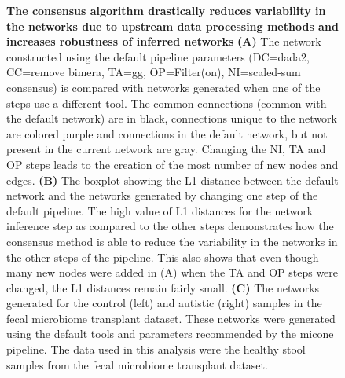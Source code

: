   \FloatBarrier
  \newpage
  \begin{figure}[H]
    \centering
    \caption{
      \textbf{The consensus algorithm drastically reduces variability in the networks due to upstream data processing methods and increases robustness of inferred networks}
      \textbf{(A)} The network constructed using the default pipeline parameters (DC=\ac{dada2}, CC=remove bimera, TA=\ac{gg}, OP=Filter(on), NI=scaled-sum consensus) is compared with networks generated when one of the steps use a different tool.
      The common connections (common with the default network) are in black, connections unique to the network are colored purple and connections in the default network, but not present in the current network are gray.
      Changing the NI, TA and OP steps leads to the creation of the most number of new nodes and edges.
      \textbf{(B)} The boxplot showing the L1 distance between the default network and the networks generated by changing one step of the default pipeline.
      The high value of L1 distances for the network inference step as compared to the other steps demonstrates how the consensus method is able to reduce the variability in the networks in the other steps of the pipeline.
      This also shows that even though many new nodes were added in (A) when the TA and OP steps were changed, the L1 distances remain fairly small.
      \textbf{(C)} The networks generated for the control (left) and autistic (right) samples in the fecal microbiome transplant dataset.
      These networks were generated using the default tools and parameters recommended by the \ac{micone} pipeline.
      The data used in this analysis were the healthy stool samples from the fecal microbiome transplant dataset.
    }
    \label{fig:figure7}
  \end{figure}


